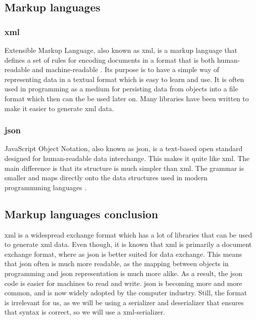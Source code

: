 \subsection{Markup languages}

\subsubsection{\gls{xml}}
Extensible Markup Language, also known as \gls{xml}, is a markup language that defines a set of rules for encoding documents in a format that is both human-readable and machine-readable \cite{bib:xml}. Its purpose is to have a simple way of representing data in a textual format which is easy to learn and use. It is often used in programming as a medium for persisting data from objects into a file format which then can the be used later on. Many libraries have been written to make it easier to generate \gls{xml} data.

\subsubsection{\gls{json}}
JavaScript Object Notation, also known as \gls{json}, is a text-based open standard designed for human-readable data interchange. This makes it quite like \gls{xml}. The main difference is that its structure is much simpler than \gls{xml}. The grammar is smaller and maps directly onto the data structures used in modern programmming languages \cite{bib:json}.

\newpage

\subsection{Markup languages conclusion}
\gls{xml} is a widespread exchange format which has a lot of libraries that can be used to generate \gls{xml} data. Even though, it is known that \gls{xml} is primarily a document exchange format, where as \gls{json} is better suited for data exchange. This means that \gls{json} often is much more readable, as the mapping between objects in programming and \gls{json} representation is much more alike. As a result, the \gls{json} code is easier for machines to read and write. \gls{json} is becoming more and more common, and is now widely adopted by the computer industry. Still, the format is irrelevant for us, as we will be using a serializer and deserializer that ensures that syntax is correct, so we will use a \gls{xml}-serializer. 
